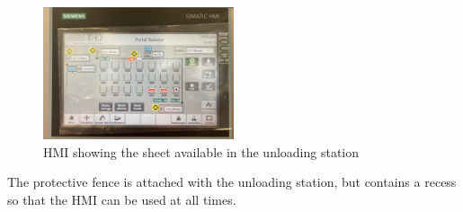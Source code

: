 \begin{enumerate}
    \begin{figure}[h]
        \centering
        \includegraphics[width=0.5\textwidth]{figures/simatic-hmi.jpeg}
        \caption{HMI showing the sheet available in the unloading station}
        \label{fig:simatic-hmi}
    \end{figure}

    The protective fence is attached with
    the unloading station, but contains a recess so that the HMI can be used at all times.
\end{enumerate}









